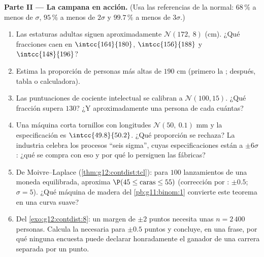 \begin{problem}
\medskip
\noindent\textbf{Parte II --- La campana en acción.}
(Usa las referencias de la normal: $68\,\%$ a menos de $\sigma$,
$95\,\%$ a menos de $2\sigma$ y $99.7\,\%$ a menos de $3\sigma$.)
\begin{enumerate}[resume]
  \item Las estaturas adultas siguen aproximadamente
        $\mathcal N(172,\ 8)$ (cm). ¿Qué fracciones caen en
        $\intcc{164}{180}$, $\intcc{156}{188}$ y $\intcc{148}{196}$?
  \item Estima la proporción de personas más altas de $190$ cm (primero la
        ; después, tabla o calculadora).
  \item Las puntuaciones de cociente intelectual se calibran a
        $\mathcal N(100, 15)$. ¿Qué fracción supera $130$? ¿Y
        aproximadamente una persona de cada cuántas?
  \item Una máquina corta tornillos con longitudes
        $\mathcal N(50,\ 0.1)$ mm y la especificación es
        $\intcc{49.8}{50.2}$. ¿Qué proporción se rechaza? La industria
        celebra los procesos ``seis sigma'', cuyas especificaciones están a
        $\pm 6\sigma$: ¿qué se compra con eso y por qué lo persiguen las
        fábricas?
  \item De Moivre--Laplace (\cref{thm:g12:contdist:tcl}): para $100$
        lanzamientos de una moneda equilibrada, aproxima
        $\P(45 \leq \text{caras} \leq 55)$ (corrección por :
        $\pm 0.5$; $\sigma = 5$). ¿Qué máquina de madera del
        \cref{pb:g11:binom:1} convierte este teorema en una curva suave?
  \item Del \cref{exo:g12:contdist:8}: un margen de $\pm 2$ puntos
        necesita unas $n = 2\,400$ personas. Calcula la  necesaria
        para $\pm 0.5$ puntos y concluye, en una frase, por qué ninguna
        encuesta puede declarar honradamente el ganador de una carrera
        separada por un punto.
\end{enumerate}


\end{problem}
